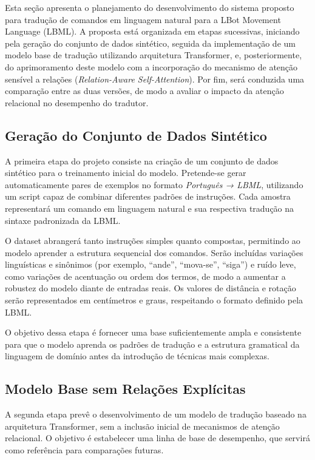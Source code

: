 \documentclass[12pt]{article}
\begin{document}
Esta seção apresenta o planejamento do desenvolvimento do sistema proposto para tradução de comandos em linguagem natural para a LBot Movement Language (LBML). A proposta está organizada em etapas sucessivas, iniciando pela geração do conjunto de dados sintético, seguida da implementação de um modelo base de tradução utilizando arquitetura Transformer, e, posteriormente, do aprimoramento deste modelo com a incorporação do mecanismo de atenção sensível a relações (\textit{Relation-Aware Self-Attention}). Por fim, será conduzida uma comparação entre as duas versões, de modo a avaliar o impacto da atenção relacional no desempenho do tradutor.

\subsection{Geração do Conjunto de Dados Sintético}

A primeira etapa do projeto consiste na criação de um conjunto de dados sintético para o treinamento inicial do modelo. Pretende-se gerar automaticamente pares de exemplos no formato \textit{Português → LBML}, utilizando um script capaz de combinar diferentes padrões de instruções. Cada amostra representará um comando em linguagem natural e sua respectiva tradução na sintaxe padronizada da LBML.

O dataset abrangerá tanto instruções simples quanto compostas, permitindo ao modelo aprender a estrutura sequencial dos comandos. Serão incluídas variações linguísticas e sinônimos (por exemplo, “ande”, “mova-se”, “siga”) e ruído leve, como variações de acentuação ou ordem dos termos, de modo a aumentar a robustez do modelo diante de entradas reais. Os valores de distância e rotação serão representados em centímetros e graus, respeitando o formato definido pela LBML.

O objetivo dessa etapa é fornecer uma base suficientemente ampla e consistente para que o modelo aprenda os padrões de tradução e a estrutura gramatical da linguagem de domínio antes da introdução de técnicas mais complexas.

\subsection{Modelo Base sem Relações Explícitas}

A segunda etapa prevê o desenvolvimento de um modelo de tradução baseado na arquitetura Transformer, sem a inclusão inicial de mecanismos de atenção relacional. O objetivo é estabelecer uma linha de base de desempenho, que servirá como referência para comparações futuras.
\end{document}
